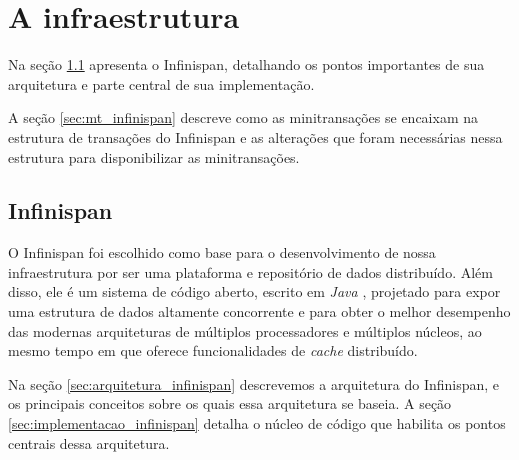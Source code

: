 \documentclass[11pt,twoside,a4paper]{book}
\begin{document}


\chapter{A infraestrutura}
\label{chap:implementacao}
Na seção \ref{sec:infinispan} apresenta o Infinispan, detalhando os pontos importantes de sua arquitetura e parte central de sua implementação. 

A seção \ref{sec:mt_infinispan} descreve como as minitransações se encaixam na estrutura de transações do Infinispan e as alterações que foram necessárias nessa estrutura para disponibilizar as minitransações.

\section{Infinispan}
\label{sec:infinispan}
O Infinispan foi escolhido como base para o desenvolvimento de nossa infraestrutura por ser uma plataforma e repositório de dados distribuído. Além disso, ele é um sistema de código aberto, escrito em \emph{Java} \cite{java}, projetado para expor uma estrutura de dados altamente concorrente e para obter o melhor desempenho das modernas arquiteturas de múltiplos processadores e múltiplos núcleos, ao mesmo tempo em que oferece funcionalidades de \emph{cache} distribuído.

Na seção \ref{sec:arquitetura_infinispan} descrevemos a arquitetura do Infinispan, e os principais conceitos sobre os quais essa arquitetura se baseia. A seção \ref{sec:implementacao_infinispan} detalha o núcleo de código que habilita os pontos centrais dessa arquitetura.
\end{document}

